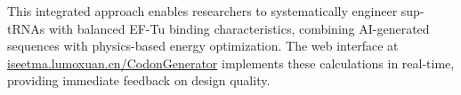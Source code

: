 This integrated approach enables researchers to systematically engineer sup-tRNAs with balanced EF-Tu binding characteristics, combining AI-generated sequences with physics-based energy optimization. The web interface at \url{iseetma.lumoxuan.cn/CodonGenerator} implements these calculations in real-time, providing immediate feedback on design quality.